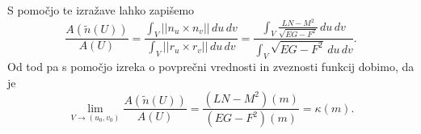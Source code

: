S pomočjo te izražave lahko zapišemo \begin{equation*}
    \frac{A(\tilde{n}(U))}{A(U)} = \frac{\int_{V} \lvert\lvert n_u \times  n_v \rvert\rvert   \, du \, dv}{\int_{V} \lvert\lvert r_u \times  r_v \rvert\rvert   \, du \, dv} 
    = \frac{\int_{V} \frac{LN - M^2}{\sqrt{EG - F^2} }   \, du \, dv}{\int_{V} \sqrt{EG - F^2} \, du \, dv }.
    \end{equation*}  
Od tod pa s pomočjo izreka o povprečni vrednosti in zveznosti funkcij dobimo, da je \begin{equation*}
\lim_{V \to (u_0, v_0)} \frac{A(\tilde{n}(U))}{A(U)} = \frac{(LN - M^2)(m)}{(EG - F^2)(m)} = \kappa(m).
\end{equation*}  
  